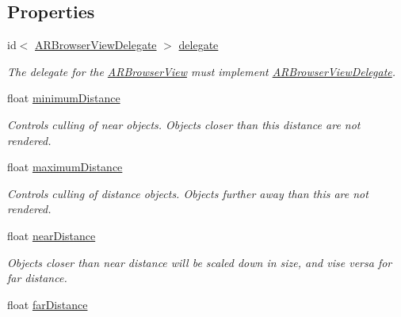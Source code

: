 \subsection*{Properties}
\begin{DoxyCompactItemize}
\item 
\hypertarget{interface_a_r_browser_view_ac71040f5d7529f5d1585f774524e6e48}{id$<$ \hyperlink{protocol_a_r_browser_view_delegate-p}{A\-R\-Browser\-View\-Delegate} $>$ \hyperlink{interface_a_r_browser_view_ac71040f5d7529f5d1585f774524e6e48}{delegate}}\label{interface_a_r_browser_view_ac71040f5d7529f5d1585f774524e6e48}

\begin{DoxyCompactList}\small\item\em The delegate for the \hyperlink{interface_a_r_browser_view}{A\-R\-Browser\-View} must implement \hyperlink{protocol_a_r_browser_view_delegate-p}{A\-R\-Browser\-View\-Delegate}. \end{DoxyCompactList}\item 
\hypertarget{interface_a_r_browser_view_a4831f23b6b057d032491050a2dd826be}{float \hyperlink{interface_a_r_browser_view_a4831f23b6b057d032491050a2dd826be}{minimum\-Distance}}\label{interface_a_r_browser_view_a4831f23b6b057d032491050a2dd826be}

\begin{DoxyCompactList}\small\item\em Controls culling of near objects. Objects closer than this distance are not rendered. \end{DoxyCompactList}\item 
\hypertarget{interface_a_r_browser_view_a3828caf0a7d28ba8e9417088ce4e736c}{float \hyperlink{interface_a_r_browser_view_a3828caf0a7d28ba8e9417088ce4e736c}{maximum\-Distance}}\label{interface_a_r_browser_view_a3828caf0a7d28ba8e9417088ce4e736c}

\begin{DoxyCompactList}\small\item\em Controls culling of distance objects. Objects further away than this are not rendered. \end{DoxyCompactList}\item 
float \hyperlink{interface_a_r_browser_view_a7d1856b25014bdbb42e053808fed67b5}{near\-Distance}
\begin{DoxyCompactList}\small\item\em Objects closer than near distance will be scaled down in size, and vise versa for far distance. \end{DoxyCompactList}\item 
\hypertarget{interface_a_r_browser_view_a24e7722ea5439f2b161939a91529643f}{float \hyperlink{interface_a_r_browser_view_a24e7722ea5439f2b161939a91529643f}{far\-Distance}}\label{interface_a_r_browser_view_a24e7722ea5439f2b161939a91529643f}


\end{DoxyCompactItemize}
